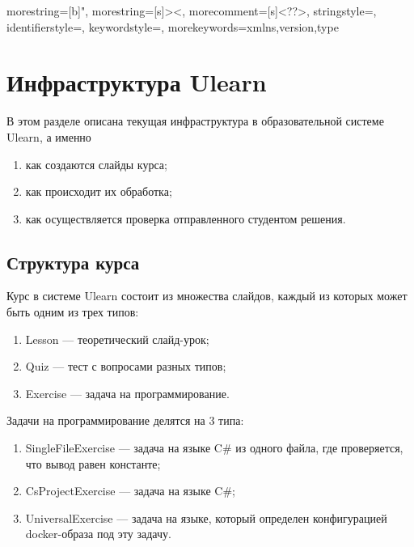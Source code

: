 

{
  morestring=[b]",
  morestring=[s]{>}{<},
  morecomment=[s]{<?}{?>},
  stringstyle=\color{black},
  identifierstyle=\color{darkblue},
  keywordstyle=\color{cyan},
  morekeywords={xmlns,version,type}%
}

\section{Инфраструктура Ulearn}
\label{cha:design}


В этом разделе описана текущая инфраструктура в образовательной системе Ulearn, а именно
\begin{enumerate}
\item как создаются слайды курса;
\item как происходит их обработка;
\item как осуществляется проверка отправленного студентом решения.
\end{enumerate}


\subsection{Структура курса}
Курс в системе Ulearn состоит из множества слайдов, каждый из которых может быть одним из трех типов:
\begin{enumerate}
\item Lesson — теоретический слайд-урок;
\item Quiz — тест с вопросами разных типов;
\item Exercise — задача на программирование.
\end{enumerate}

Задачи на программирование делятся на 3 типа: 
\begin{enumerate}
\item SingleFileExercise — задача на языке C\# из одного файла, где проверяется, что вывод равен константе;
\item CsProjectExercise — задача на языке C\#;
\item UniversalExercise — задача на языке, который определен конфигурацией docker-образа под эту задачу.
\end{enumerate}

